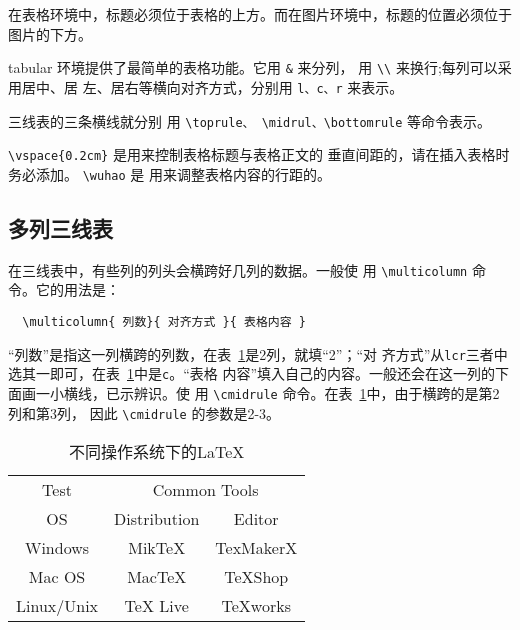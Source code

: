 在表格环境中，标题必须位于表格的上方。而在图片环境中，标题的位置必须位于
图片的下方。

tabular 环境提供了最简单的表格功能。它用 \texttt{\&} 来分列，
用 \texttt{\textbackslash{\textbackslash{}}} 来换行;每列可以采用居中、居
左、居右等横向对齐方式，分别用 \texttt{l、c、r} 来表示。

三线表的三条横线就分别
用 \verb|\toprule、 \midrul、\bottomrule| 等命令表示。

\verb|\vspace{0.2cm}| 是用来控制表格标题与表格正文的
垂直间距的，请在插入表格时务必添加。 \verb|\wuhao| 是
用来调整表格内容的行距的。


\subsection{多列三线表}

在三线表中，有些列的列头会横跨好几列的数据。一般使
用 \verb|\multicolumn| 命令。它的用法是：
\begin{lstlisting}
  \multicolumn{ 列数}{ 对齐方式 }{ 表格内容 }
\end{lstlisting}

“列数”是指这一列横跨的列数，在表~\ref{tab:linux}是2列，就填“2”；“对
齐方式”从\texttt{lcr}三者中选其一即可，在表~\ref{tab:linux}中是\texttt{c}。“表格
内容”填入自己的内容。一般还会在这一列的下面画一小横线，已示辨识。使
用 \verb|\cmidrule| 命令。在表~\ref{tab:linux}中，由于横跨的是第2列和第3列，
因此 \verb|\cmidrule| 的参数是2-3。

\begin{table}[htbp]
  \caption{不同操作系统下的\LaTeX{}}
  \label{tab:linux}
  \centering
  \vspace{0.2cm}
  \wuhao
  \begin{tabular}{ccc}
    \toprule
    Test       & \multicolumn{2}{c}{Common Tools}             \\
    \cmidrule{2-3}
    OS         & Distribution                     & Editor    \\
    \midrule
    Windows    & MikTeX                           & TexMakerX \\
    Mac OS     & MacTeX                           & TeXShop   \\
    Linux/Unix & TeX Live                         & TeXworks  \\
    \bottomrule
  \end{tabular}
\end{table}



